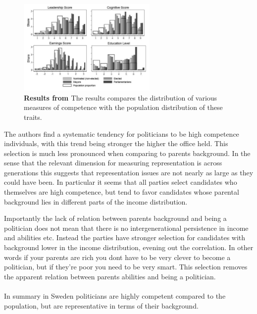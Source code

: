 \begin{figure}
    \includegraphics[width=0.6\textwidth]{figures/dal_bo_1.png}
    \caption{\textbf{Results from \cite{dal_bo_who_2017}} The results compares the distribution of various measures of competence with the population distribution of these traits.}    
\end{figure}

The authors find a systematic tendency for politicians to be high competence individuals, with this trend being stronger the higher the office held. This selection is much less pronounced when comparing to parents background. In the sense that the relevant dimension for measuring representation is across generations this suggests that representation issues are not nearly as large as they could have been. In particular it seems that all parties select candidates who themselves are high competence, but tend to favor candidates whose parental background lies in different parts of the income distribution. 

Importantly the lack of relation between parents background and being a politician does not mean that there is no intergenerational persistence in income and abilities etc. Instead the parties have stronger selection for candidates with background lower in the income distribution, evening out the correlation. In other words if your parents are rich you dont have to be very clever to become a politician, but if they're poor you need to be very smart. This selection removes the apparent relation between parents abilities and being a politician.
\\ \\
In summary in Sweden politicians are highly competent compared to the population, but are representative in terms of their background.